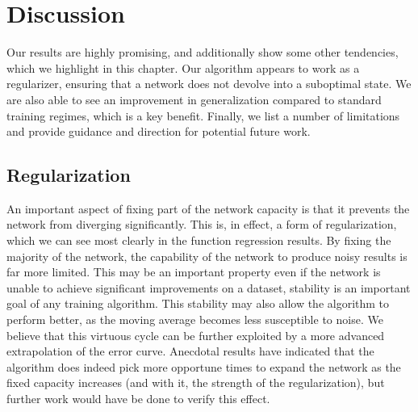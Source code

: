 \chapter{Discussion}
Our results are highly promising, and additionally show some other tendencies, which we highlight in this chapter.
Our algorithm appears to work as a regularizer, ensuring that a network does not devolve into a suboptimal state.
We are also able to see an improvement in generalization compared to standard training regimes, which is a key benefit.
Finally, we list a number of limitations and provide guidance and direction for potential future work.

\section{Regularization}

An important aspect of fixing part of the network capacity is that it prevents the network from diverging significantly.
This is, in effect, a form of regularization, which we can see most clearly in the function regression results.
By fixing the majority of the network, the capability of the network to produce noisy results is far more limited.
This may be an important property even if the network is unable to achieve significant improvements on a dataset, stability is an important goal of any training algorithm.
This stability may also allow the algorithm to perform better, as the moving average becomes less susceptible to noise.
We believe that this virtuous cycle can be further exploited by a more advanced extrapolation of the error curve.
Anecdotal results have indicated that the algorithm does indeed pick more opportune times to expand the network as the fixed capacity increases (and with it, the strength of the regularization), but further work would have be done to verify this effect.

